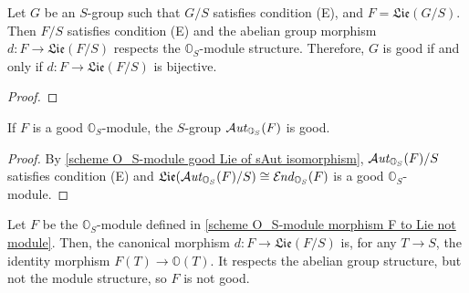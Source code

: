 \begin{lemma}\label{scheme group condition (E) Lie of Lie module morphism}
Let $G$ be an $S$-group such that $G/S$ satisfies condition (E), and $F=\mathfrak{Lie}(G/S)$. Then $F/S$ satisfies condition (E) and the abelian group morphism $d:F\to\mathfrak{Lie}(F/S)$ respects the $\mathbb{O}_S$-module structure. Therefore, $G$ is good if and only if $d:F\to\mathfrak{Lie}(F/S)$ is bijective.
\end{lemma}
\begin{proof}

\end{proof}

\begin{theorem}\label{scheme O_S-module good Aut is good}
If $F$ is a good $\mathbb{O}_S$-module, the $S$-group $\operatorname{\mathcal{A}\hspace*{-0.2pt}\textit{ut}\hspace{0.5pt}}_{\mathbb{O}_S}(F)$ is good.
\end{theorem}
\begin{proof}
By \cref{scheme O_S-module good Lie of sAut isomorphism}, $\operatorname{\mathcal{A}\hspace*{-0.2pt}\textit{ut}\hspace{0.5pt}}_{\mathbb{O}_S}(F)/S$ satisfies condition (E) and $\mathfrak{Lie}(\operatorname{\mathcal{A}\hspace*{-0.2pt}\textit{ut}\hspace{0.5pt}}_{\mathbb{O}_S}(F)/S)\cong\operatorname{\mathcal{E}\hspace*{-1pt}\textit{nd}\hspace{0.5pt}}_{\mathbb{O}_S}(F)$ is a good $\mathbb{O}_S$-module.
\end{proof}

\begin{example}\label{scheme O_S-module p-twisted G_m not good}
Let $F$ be the $\mathbb{O}_S$-module defined in \cref{scheme O_S-module morphism F to Lie not module}. Then, the canonical morphism $d:F\to\mathfrak{Lie}(F/S)$ is, for any $T\to S$, the identity morphism $F(T)\to\mathbb{O}(T)$. It respects the abelian group structure, but not the module structure, so $F$ is not good.
\end{example}

